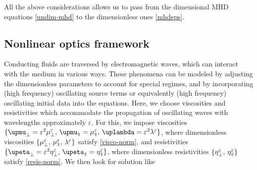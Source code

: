 \documentclass[11pt,reqno]{amsart}
\newcommand{\myparallel}{{\mkern3mu\vphantom{\perp}\vrule depth 0pt\mkern2mu\vrule depth 0pt\mkern3mu}}
\begin{document}
All the above considerations allows us to pass from the dimensional MHD equations \eqref{undim-mhd} to the dimensionless ones \eqref{mhdeps}.


\subsection{Nonlinear optics framework} Conducting fluids are traversed by electromagnetic waves, which can interact with the medium in various ways. These phenomena can be modeled by adjusting the dimensionless parameters to account for special regimes, and by incorporating (high frequency) oscillating source terms or equivalently (high frequency) oscillating initial data into the equations. Here, we choose viscosities and resistivities which accommodate the propagation of oscillating waves with wavelengths approximately $\varepsilon$. For this, we impose viscosities $\{\upmu_\perp=\varepsilon^2 \mu_\perp^\varepsilon,\,  \upmu_\myparallel= \mu_\myparallel^\varepsilon,\, \uplambda=\varepsilon^2 \lambda^\varepsilon\}$, where dimensionless viscosities $\{\mu_\perp^\varepsilon,\, \mu_\myparallel^\varepsilon,\, \lambda^\varepsilon\}$ satisfy \eqref{visco-norm}, and resistivities $\{\upeta_\perp=\varepsilon^2 \eta_\perp^\varepsilon,\,  \upeta_\myparallel= \eta_\myparallel^\varepsilon\}$, where dimensionless resistivities $\{\eta_\perp^\varepsilon,\, \eta_\myparallel^\varepsilon\}$ satisfy \eqref{resis-norm}. We then look for solution like
\end{document}
